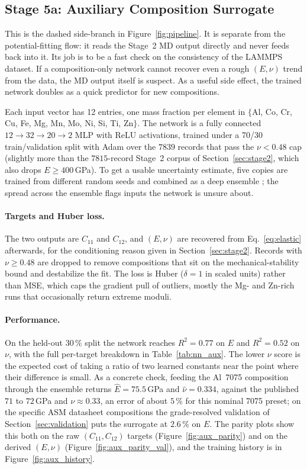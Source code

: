 \subsection{Stage 5a: Auxiliary Composition Surrogate}
\label{sec:comp_nn}

This is the dashed side-branch in Figure~\ref{fig:pipeline}. It is separate
from the potential-fitting flow: it reads the Stage~2 MD output directly and
never feeds back into it. Its job is to be a fast check on the consistency of
the LAMMPS dataset. If a composition-only network cannot recover even a rough
$(E,\nu)$ trend from the data, the MD output itself is suspect. As a useful
side effect, the trained network doubles as a quick predictor for new
compositions.

Each input vector has 12 entries, one mass fraction per element in
$\{$Al, Co, Cr, Cu, Fe, Mg, Mn, Mo, Ni, Si, Ti, Zn$\}$. The network is a
fully connected $12\to32\to20\to2$ MLP with ReLU activations, trained under a
70/30 train/validation split with Adam over the $7839$ records that pass the
$\nu<0.48$ cap (slightly more than the $7815$-record Stage~2 corpus of
Section~\ref{sec:stage2}, which also drops $E\geq400$\,GPa). To get a usable uncertainty estimate,
five copies are trained from different random seeds and combined as a deep
ensemble \citep{lakshminarayanan2017}; the spread across the ensemble flags
inputs the network is unsure about.

\paragraph{Targets and Huber loss.}
The two outputs are $C_{11}$ and $C_{12}$, and $(E,\nu)$ are recovered from
Eq.~\eqref{eq:elastic} afterwards, for the conditioning reason given in
Section~\ref{sec:stage2}. Records with $\nu\geq0.48$ are dropped to remove
compositions that sit on the mechanical-stability bound and destabilize the
fit. The loss is Huber ($\delta=1$ in scaled units) rather than MSE, which
caps the gradient pull of outliers, mostly the Mg- and Zn-rich runs that
occasionally return extreme moduli.

\paragraph{Performance.}
On the held-out 30\,\% split the network reaches $R^2 = 0.77$ on $E$ and
$R^2 = 0.52$ on $\nu$, with the full per-target breakdown in
Table~\ref{tab:nn_aux}. The lower $\nu$ score is the expected cost of taking a
ratio of two learned constants near the point where their difference is small.
As a concrete check, feeding the Al~7075 composition through the ensemble
returns $\hat E = 75.5$\,GPa and $\hat\nu = 0.334$, against the published
$71$ to $72$\,GPa and $\nu\approx0.33$, an error of about $5\,\%$ for this
nominal 7075 preset; on the specific ASM datasheet compositions the
grade-resolved validation of Section~\ref{sec:validation} puts the surrogate at
$2.6\,\%$ on $E$. The parity plots show this both on the raw $(C_{11},C_{12})$
targets (Figure~\ref{fig:aux_parity}) and on the derived $(E,\nu)$
(Figure~\ref{fig:aux_parity_val}), and the training history is in
Figure~\ref{fig:aux_history}.

